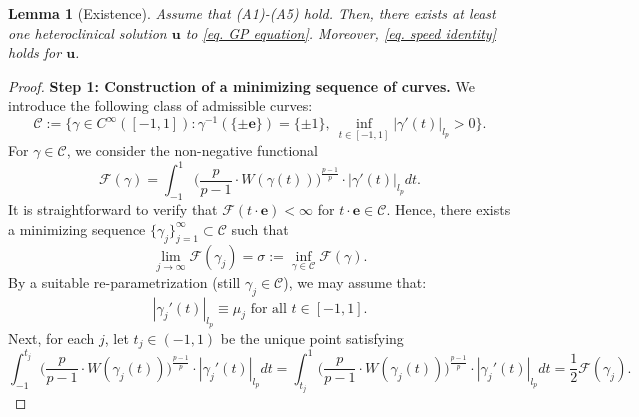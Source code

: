\documentclass[11pt,twoside,reqno]{amsart}
\newcounter{assu}
\newtheorem{lemma}{Lemma}[section]
\numberwithin{equation}{section}
\begin{document}
\begin{lemma}[Existence]\label{lem. existence}
    Assume that (A1)-(A5) hold. Then, there exists at least one heteroclinical solution $\mathbf{u}$ to \eqref{eq. GP equation}. Moreover, \eqref{eq. speed identity} holds for $\mathbf{u}$.
\end{lemma}
\begin{proof}
    \textbf{Step 1: Construction of a minimizing sequence of curves.} 
    We introduce the following class of admissible curves:
    \begin{equation*}
        \mathcal{C}:=\Big\{\gamma\in C^{\infty}([-1,1]):\gamma^{-1}(\{\pm\mathbf{e}\})=\{\pm1\},\ \inf_{t\in[-1,1]}|\gamma'(t)|_{l_{p}}>0\Big\}.
    \end{equation*}
     For $\gamma\in\mathcal{C}$, we consider the non-negative functional
    \begin{equation*}
        \mathcal{F}(\gamma)=\int_{-1}^{1}\Big(\frac{p}{p-1}\cdot W(\gamma(t))\Big)^{\frac{p-1}{p}}\cdot|\gamma'(t)|_{l_{p}}dt.
    \end{equation*}
    It is straightforward to verify that $\mathcal{F}(t\cdot\mathbf{e})<\infty$ for $t\cdot\mathbf{e}\in\mathcal{C}$.  Hence, there exists a minimizing
    sequence $\{\gamma_j\}_{j=1}^{\infty}\subset\mathcal{C}$ such that
    \begin{equation*}
        \lim_{j\to\infty}\mathcal{F}(\gamma_{j})=\sigma:=\inf_{\gamma\in\mathcal{C}}\mathcal{F}(\gamma).
    \end{equation*}
    By a suitable re-parametrization (still $\gamma_{j}\in\mathcal{C}$), we may assume that:
    \begin{equation*}
        |\gamma_{j}'(t)|_{l_{p}}\equiv\mu_{j}\mbox{ for all }t\in[-1,1].
    \end{equation*}
     Next, for each $j$, let $t_j\in(-1,1)$ be the unique point satisfying
    \begin{equation*}
        \int_{-1}^{t_{j}}\Big(\frac{p}{p-1}\cdot W(\gamma_{j}(t))\Big)^{\frac{p-1}{p}}\cdot|\gamma_{j}'(t)|_{l_{p}}dt=\int_{t_{j}}^{1}\Big(\frac{p}{p-1}\cdot W(\gamma_{j}(t))\Big)^{\frac{p-1}{p}}\cdot|\gamma_{j}'(t)|_{l_{p}}dt=\frac{1}{2}\mathcal{F}(\gamma_{j}).
    \end{equation*}
    

\end{proof}
\end{document}
